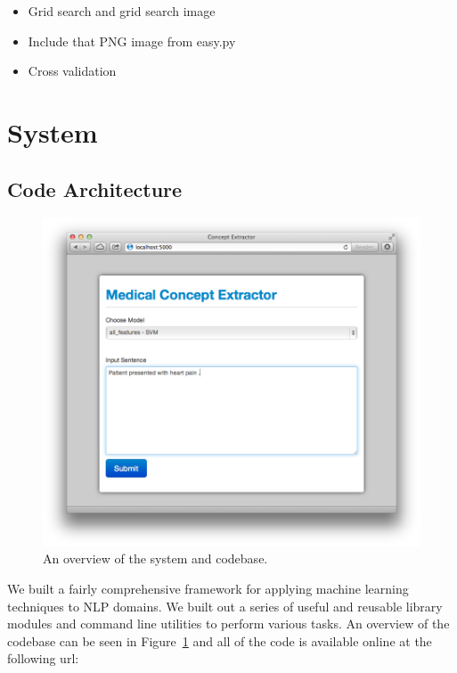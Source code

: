 \documentclass[preprint]{style}
\begin{document}
\begin{itemize}

\item Grid search and grid search image

\item Include that PNG image from easy.py

\item Cross validation

\end{itemize}




\section{System}

\subsection{Code Architecture}

\begin{figure}
\begin{center}
	\includegraphics[width=1\columnwidth]{figures/system.png}
\end{center}
\caption{An overview of the system and codebase.}
\label{fig:system}
\end{figure}


We built a fairly comprehensive framework for applying machine learning techniques to NLP domains. We built out a series of useful and reusable library modules and command line utilities to perform various tasks. An overview of the codebase can be seen in Figure~\ref{fig:system} and  all of the code is available online at the following url:
\end{document}
